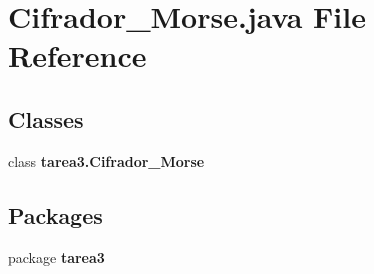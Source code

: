 \section{Cifrador\+\_\+\+Morse.\+java File Reference}
\label{_cifrador___morse_8java}
\subsection*{Classes}
\begin{DoxyCompactItemize}
\item 
class {\bf tarea3.\+Cifrador\+\_\+\+Morse}
\end{DoxyCompactItemize}
\subsection*{Packages}
\begin{DoxyCompactItemize}
\item 
package {\bf tarea3}
\end{DoxyCompactItemize}
